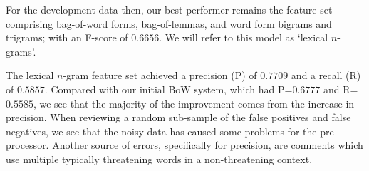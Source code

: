 \documentclass[11pt,letterpaper]{article}
\begin{document}
For the development data then, our best performer remains the feature set comprising bag-of-word forms, bag-of-lemmas, and word form bigrams and trigrams; with an F-score of $0.6656$. We will refer to this model as `lexical $n$-grams'. %







The lexical $n$-gram feature set achieved a precision (P) of $0.7709$ and a recall (R) of $0.5857$. Compared with our initial BoW system, which had P=$0.6777$ and R=$0.5585$, we see that the majority of the improvement comes from the increase in precision. When reviewing a random sub-sample of the false positives and false negatives, we see that the noisy data has caused some problems for the pre-processor. %
Another source of errors, specifically for precision, are comments which use multiple typically threatening words in a non-threatening context.


      
      
\end{document}
